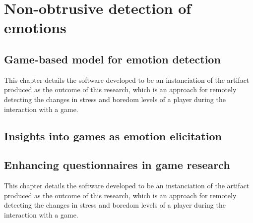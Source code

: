 \chapter{Non-obtrusive detection of emotions}
\label{ch:discussion}

\section{Game-based model for emotion detection}

This chapter details the software developed to be an instanciation of the artifact produced as the outcome of this research, which is an approach for remotely detecting the changes in stress and boredom levels of a player during the interaction with a game.

\section{Insights into games as emotion elicitation}

\section{Enhancing questionnaires in game research}

This chapter details the software developed to be an instanciation of the artifact produced as the outcome of this research, which is an approach for remotely detecting the changes in stress and boredom levels of a player during the interaction with a game.
